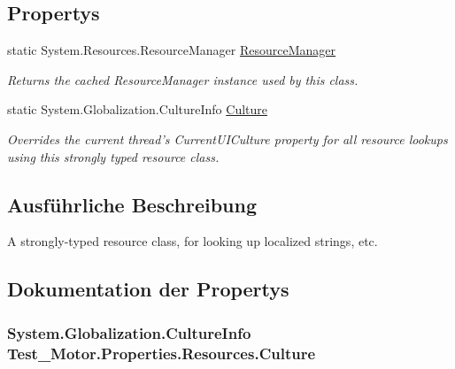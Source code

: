 \subsection*{Propertys}
\begin{DoxyCompactItemize}
\item 
static System.Resources.ResourceManager \hyperlink{class_test___motor_1_1_properties_1_1_resources_a330443da8bc114186360e46f8a44fc01}{ResourceManager}
\begin{DoxyCompactList}\small\item\em Returns the cached ResourceManager instance used by this class. \item\end{DoxyCompactList}\item 
static System.Globalization.CultureInfo \hyperlink{class_test___motor_1_1_properties_1_1_resources_ad1c15db40048850de2e5b617b5a56403}{Culture}
\begin{DoxyCompactList}\small\item\em Overrides the current thread's CurrentUICulture property for all resource lookups using this strongly typed resource class. \item\end{DoxyCompactList}\end{DoxyCompactItemize}


\subsection{Ausführliche Beschreibung}
A strongly-\/typed resource class, for looking up localized strings, etc. 

\subsection{Dokumentation der Propertys}
\hypertarget{class_test___motor_1_1_properties_1_1_resources_ad1c15db40048850de2e5b617b5a56403}{
\subsubsection[{Culture}]{\setlength{\rightskip}{0pt plus 5cm}System.Globalization.CultureInfo Test\_\-Motor.Properties.Resources.Culture}}
\label{class_test___motor_1_1_properties_1_1_resources_ad1c15db40048850de2e5b617b5a56403}


